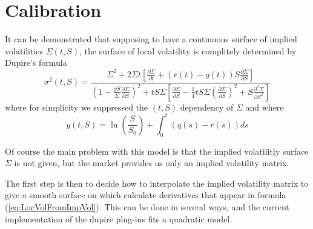 \section{Calibration}

It can be demonstrated that supposing to have a continuous surface of implied volatilities $\Sigma(t,S)$, the surface of local volatility is complitely determined by Dupire's formula
\begin{equation}\label{eq:LocVolFromImpVol}
\sigma^2(t, S) = \frac{ \Sigma^2 + 2\Sigma t \left[\frac{\partial\Sigma}{\partial t} + (r(t) - q(t))S\frac{\partial\Sigma}{\partial S} \right] }{ \left( 1- \frac{yS}{\Sigma} \frac{\partial\Sigma}{\partial S} \right)^2 + tS\Sigma\left[ \frac{\partial\Sigma}{\partial S} - \frac{1}{4} tS\Sigma \left(\frac{\partial\Sigma}{\partial S}\right)^2 + S\frac{\partial^2\Sigma}{\partial S^2} \right] }
\end{equation}
where for simplicity we suppressed the $(t,S)$ dependency of $\Sigma$ and where
\begin{equation}
y(t,S) = \ln\left( \frac{S}{S_0} \right) + \int_{0}^t(q(s) - r(s))ds
\end{equation}

Of course the main problem with this model is that the implied volatilitly surface $\Sigma$ is not given, but the market provides us only an implied volatility matrix.

The first step is then to decide how to interpolate the implied volatility matrix to give a smooth surface on which calculate derivatives that appear in formula (\ref{eq:LocVolFromImpVol}). This can be done in several ways, and the current implementation of the dupire plug-ins fits a quadratic model.







